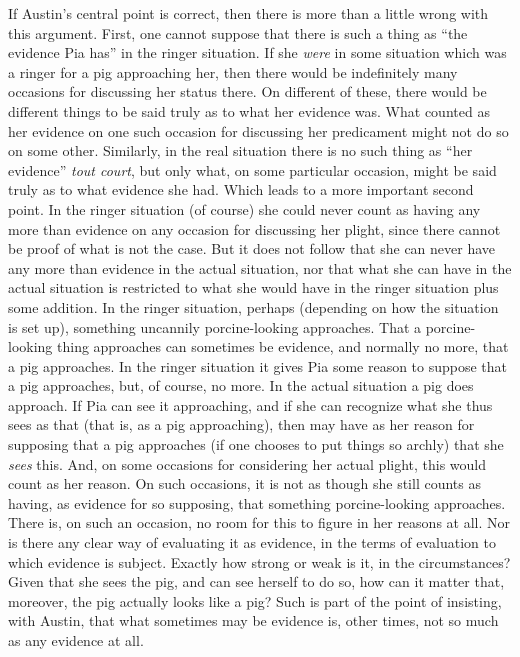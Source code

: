 If Austin's central point is correct, then there is more than a little wrong with this argument. First, one cannot suppose that there is such a thing as ``the evidence Pia has'' in the ringer situation. If she \emph{were} in some situation which was a ringer for a pig approaching her, then there would be indefinitely many occasions for discussing her status there. On different of these, there would be different things to be said truly as to what her evidence was. What counted as her evidence on one such occasion for discussing her predicament might not do so on some other. Similarly, in the real situation there is no such thing as ``her evidence'' \emph{tout court}, but only what, on some particular occasion, might be said truly as to what evidence she had. Which leads to a more important second point. In the ringer situation (of course) she could never count as having any more than evidence on any occasion for discussing her plight, since there cannot be proof of what is not the case. But it does not follow that she can never have any more than evidence in the actual situation, nor that what she can have in the actual situation is restricted to what she would have in the ringer situation plus some addition. In the ringer situation, perhaps (depending on how the situation is set up), something uncannily porcine-looking approaches. That a porcine-looking thing approaches can sometimes be evidence, and normally no more, that a pig approaches. In the ringer situation it gives Pia some reason to suppose that a pig approaches, but, of course, no more. In the actual situation a pig does approach. If Pia can see it approaching, and if she can recognize what she thus sees as that (that is, as a pig approaching), then may have as her reason for supposing that a pig approaches (if one chooses to put things so archly) that she \emph{sees} this. And, on some occasions for considering her actual plight, this would count as her reason. On such occasions, it is not as though she still counts as having, as evidence for so supposing, that something porcine-looking approaches. There is, on such an occasion, no room for this to figure in her reasons at all. Nor is there any clear way of evaluating it as evidence, in the terms of evaluation to which evidence is subject. Exactly how strong or weak is it, in the circumstances? Given that she sees the pig, and can see herself to do so, how can it matter that, moreover, the pig actually looks like a pig? Such is part of the point of insisting, with Austin, that what sometimes may be evidence is, other times, not so much as any evidence at all.

